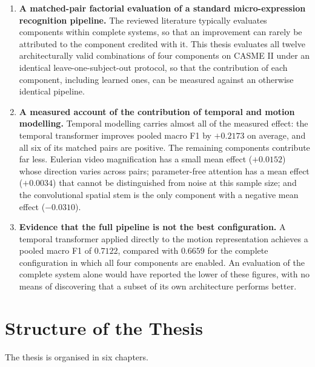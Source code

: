 \begin{enumerate}
	\item \textbf{A matched-pair factorial evaluation of a standard micro-expression recognition pipeline.} The reviewed literature typically evaluates components within complete systems, so that an improvement can rarely be attributed to the component credited with it. This thesis evaluates all twelve architecturally valid combinations of four components on CASME II under an identical leave-one-subject-out protocol, so that the contribution of each component, including learned ones, can be measured against an otherwise identical pipeline.

	\item \textbf{A measured account of the contribution of temporal and motion modelling.} Temporal modelling carries almost all of the measured effect: the temporal transformer improves pooled macro F1 by $+0.2173$ on average, and all six of its matched pairs are positive. The remaining components contribute far less. Eulerian video magnification has a small mean effect ($+0.0152$) whose direction varies across pairs; parameter-free attention has a mean effect ($+0.0034$) that cannot be distinguished from noise at this sample size; and the convolutional spatial stem is the only component with a negative mean effect ($-0.0310$).

	\item \textbf{Evidence that the full pipeline is not the best configuration.} A temporal transformer applied directly to the motion representation achieves a pooled macro F1 of $0.7122$, compared with $0.6659$ for the complete configuration in which all four components are enabled. An evaluation of the complete system alone would have reported the lower of these figures, with no means of discovering that a subset of its own architecture performs better.
\end{enumerate}


\section{Structure of the Thesis}
\label{sec:structure}

The thesis is organised in six chapters.

